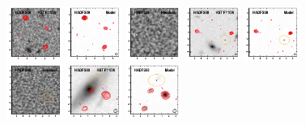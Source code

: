 \documentclass[iop]{emulateapj}
\begin{document}
\begin{figure}[!tbp]
\begin{centering}
\includegraphics[width=0.162\textwidth]{../Figures/modelfit/HADFS09_optical_bestfit.pdf}
\includegraphics[width=0.162\textwidth]{../Figures/modelfit/HADFS09_model_bestfit.pdf}
\includegraphics[width=0.162\textwidth]{../Figures/modelfit/HADFS09_residual_bestfit.pdf}
\includegraphics[width=0.162\textwidth]{../Figures/modelfit/HADFS08_optical_bestfit.pdf}
\includegraphics[width=0.162\textwidth]{../Figures/modelfit/HADFS08_model_bestfit.pdf}
\includegraphics[width=0.162\textwidth]{../Figures/modelfit/HADFS08_residual_bestfit.pdf}
\includegraphics[width=0.162\textwidth]{../Figures/modelfit/HADFS03_optical_bestfit.pdf}
\includegraphics[width=0.162\textwidth]{../Figures/modelfit/HADFS03_model_bestfit.pdf}

\end{centering}
\end{figure}
\end{document}
